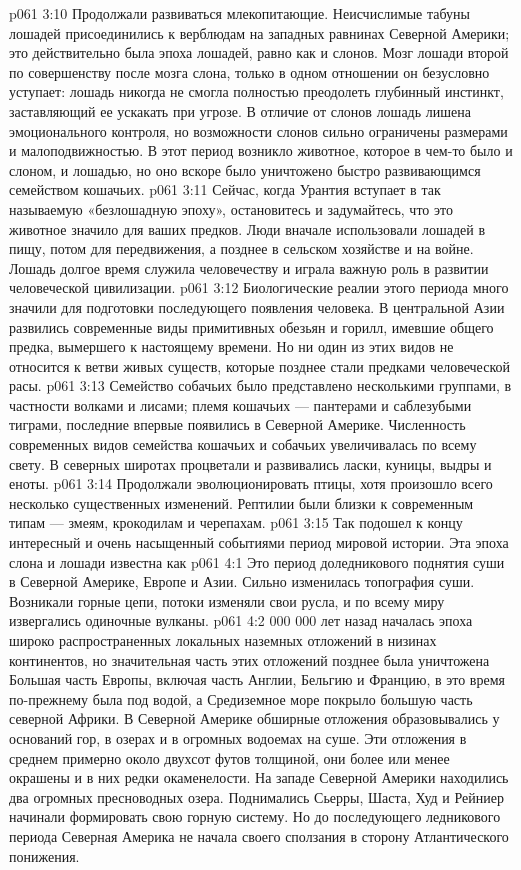 \vs p061 3:10 Продолжали развиваться млекопитающие. Неисчислимые табуны лошадей присоединились к верблюдам на западных равнинах Северной Америки; это действительно была эпоха лошадей, равно как и слонов. Мозг лошади второй по совершенству после мозга слона, только в одном отношении он безусловно уступает: лошадь никогда не смогла полностью преодолеть глубинный инстинкт, заставляющий ее ускакать при угрозе. В отличие от слонов лошадь лишена эмоционального контроля, но возможности слонов сильно ограничены размерами и малоподвижностью. В этот период возникло животное, которое в чем\hyp{}то было и слоном, и лошадью, но оно вскоре было уничтожено быстро развивающимся семейством кошачьих.
\vs p061 3:11 \pc Сейчас, когда Урантия вступает в так называемую «безлошадную эпоху», остановитесь и задумайтесь, что это животное значило для ваших предков. Люди вначале использовали лошадей в пищу, потом для передвижения, а позднее в сельском хозяйстве и на войне. Лошадь долгое время служила человечеству и играла важную роль в развитии человеческой цивилизации.
\vs p061 3:12 \pc Биологические реалии этого периода много значили для подготовки последующего появления человека. В центральной Азии развились современные виды примитивных обезьян и горилл, имевшие общего предка, вымершего к настоящему времени. Но ни один из этих видов не относится к ветви живых существ, которые позднее стали предками человеческой расы.
\vs p061 3:13 Семейство собачьих было представлено несколькими группами, в частности волками и лисами; племя кошачьих --- пантерами и саблезубыми тиграми, последние впервые появились в Северной Америке. Численность современных видов семейства кошачьих и собачьих увеличивалась по всему свету. В северных широтах процветали и развивались ласки, куницы, выдры и еноты.
\vs p061 3:14 Продолжали эволюционировать птицы, хотя произошло всего несколько существенных изменений. Рептилии были близки к современным типам --- змеям, крокодилам и черепахам.
\vs p061 3:15 \pc Так подошел к концу интересный и очень насыщенный событиями период мировой истории. Эта эпоха слона и лошади известна как 
\vs p061 4:1 Это период доледникового поднятия суши в Северной Америке, Европе и Азии. Сильно изменилась топография суши. Возникали горные цепи, потоки изменяли свои русла, и по всему миру извергались одиночные вулканы.
\vs p061 4:2  000 000 лет назад началась эпоха широко распространенных локальных наземных отложений в низинах континентов, но значительная часть этих отложений позднее была уничтожена Большая часть Европы, включая часть Англии, Бельгию и Францию, в это время по\hyp{}прежнему была под водой, а Средиземное море покрыло большую часть северной Африки. В Северной Америке обширные отложения образовывались у оснований гор, в озерах и в огромных водоемах на суше. Эти отложения в среднем примерно около двухсот футов толщиной, они более или менее окрашены и в них редки окаменелости. На западе Северной Америки находились два огромных пресноводных озера. Поднимались Сьерры, Шаста, Худ и Рейниер начинали формировать свою горную систему. Но до последующего ледникового периода Северная Америка не начала своего сползания в сторону Атлантического понижения.
